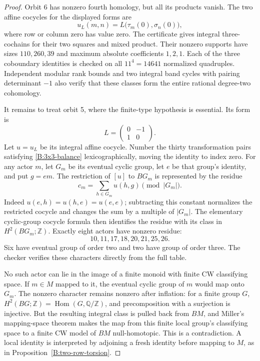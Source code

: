 \begin{proof}
Orbit 6 has nonzero fourth homology, but all its products vanish.
The two affine cocycles for the displayed forms are
\[
 u_L(m,n)=L\bigl(\tau_m(0),\sigma_n(0)\bigr),
\]
where row or column zero has value zero.  The certificate
gives integral three-cochains for their two squares and mixed
product.  Their nonzero supports have sizes $110,260,39$ and
maximum absolute coefficients $1,2,1$.  Each of the three
coboundary identities is checked on all $11^4=14641$ normalized
quadruples.  Independent modular rank bounds and two integral band
cycles with pairing determinant $-1$ also verify that these classes
form the entire rational degree-two cohomology.

It remains to treat orbit 5, where the finite-type hypothesis is
essential.  Its form is
\[
 L=\begin{pmatrix}0&-1\\1&0\end{pmatrix}.
\]
Let $u=u_L$ be its integral affine cocycle.  Number the thirty
transformation pairs satisfying \eqref{B:3x3-balance}
lexicographically, moving the identity to index zero.
For any actor $m$, let $G_m$ be its eventual cyclic group, let $e$
be that group's identity, and put $g=em$.  The restriction of $[u]$
to $BG_m$ is represented by the residue
\begin{equation}\label{B:3x3-cyclic-character}
 c_m=\sum_{h\in G_m}u(h,g)\pmod{|G_m|}.
\end{equation}
Indeed $u(e,h)=u(h,e)=u(e,e)$; subtracting this constant normalizes
the restricted cocycle and changes the sum by a multiple of $|G_m|$.
The elementary cyclic-group cocycle formula then identifies the
residue with its class in $H^2(BG_m;\mathbb Z)$.
Exactly eight actors have nonzero residue:
\[
 10,11,17,18,20,21,25,26.
\]
Six have eventual group of order two and two have group of order three.
The checker verifies these characters directly from the full table.

No such actor can lie in the image of a finite monoid with finite
CW classifying space.  If $m\in M$ mapped to it, the eventual cyclic
group of $m$ would map onto $G_m$.  The nonzero character remains
nonzero after inflation: for a finite group $G$,
$H^2(BG;\mathbb Z)=\operatorname{Hom}(G,\mathbb Q/\mathbb Z)$,
and precomposition with a surjection is injective.  But the resulting
integral class is pulled back from $BM$, and Miller's mapping-space
theorem makes the map from this finite local group's classifying
space to a finite CW model of $BM$ null-homotopic.  This is a
contradiction.  A local identity is interpreted by adjoining a fresh
identity before mapping to $M$, as in
Proposition~\ref{B:two-row-torsion}.


\end{proof}
